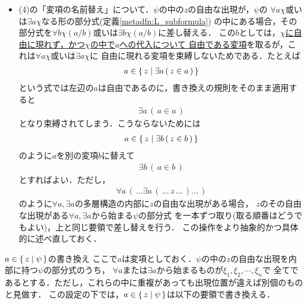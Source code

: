 \begin{itemize}
		\item (4)の「変項の名前替え」について．$\psi$の中の$z$の自由な出現が，$\psi$の
			$\forall a \chi$或いは$\exists a \chi$なる形の部分式(定義\ref{metadfn:L_subformula})
			の中にある場合，その部分式を$\forall b \chi(a/b)$或いは$\exists b \chi(a/b)$に差し替える．
			この$b$としては，\underline{$\chi$に自由に現れず，かつ$\chi$の中で$a$への代入について
			自由である変項}を取るが，これは$\forall a \chi$或いは$\exists a \chi$に
			自由に現れる変項を束縛しないためである．たとえば
			\begin{align}
				a \in \{\, z \mid \exists a\, (\, z \in a\, )\, \}
			\end{align}
			という式では左辺の$a$は自由であるのに，書き換えの規則をそのまま適用すると
			\begin{align}
				\exists a\, (\, a \in a\, )
			\end{align}
			となり束縛されてしまう．こうならないためには
			\begin{align}
				a \in \{\, z \mid \exists b\, (\, z \in b\, )\, \}
			\end{align}
			のように$a$を別の変項$b$に替えて
			\begin{align}
				\exists b\, (\, a \in b\, )
			\end{align}
			とすればよい．ただし，
			\begin{align}
				\forall a\, (\, ...\exists a\, (\, ...\, z\, ...\, )...\, )
			\end{align}
			のように$\forall a,\exists a$の多層構造の内部に$z$の自由な出現がある場合，
			$z$のその自由な出現がある$\forall a,\exists a$から始まる$\psi$の部分式
			を一本ずつ取り(取る順番はどうでもよい)，上と同じ要領で差し替えを行う．
			この操作をより抽象的かつ具体的に述べ直しておく．
	\end{itemize}
		
	\begin{itembox}[l]{$a \in \{\, z \mid \psi\, \}$の書き換え}
			ここで$a$は変項としておく．$\psi$の中の$z$の自由な出現を内部に持つ$\psi$の部分式のうち，
			$\forall a$または$\exists a$から始まるものが$\xi_{1},\xi_{2},\cdots,\xi_{n}$で
			全てであるとする．ただし，これらの中に重複があっても出現位置が違えば別個のものと見做す．
			この設定の下では，$a \in \{\, z \mid \psi\, \}$は以下の要領で書き換える．
	\end{itembox}
	
